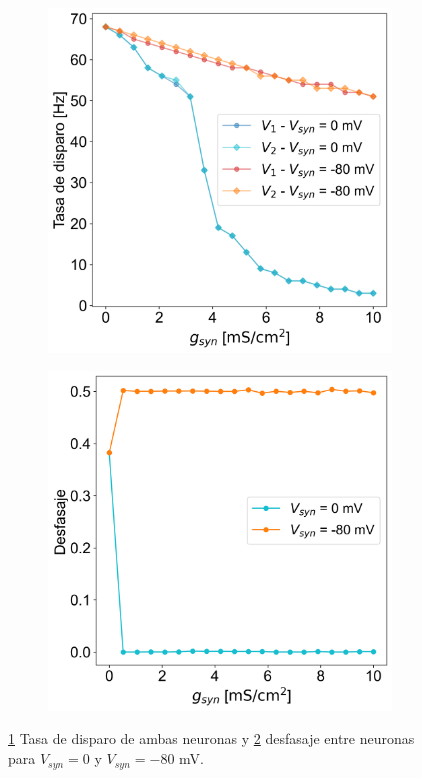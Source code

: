 \documentclass[aps,prb,twocolumn,superscriptaddress,floatfix,longbibliography]{revtex4-2}
\newcounter{para}
\begin{document}
\begin{figure}[h]
   \centering
   \begin{subfigure}[b]{0.45\textwidth}
        \includegraphics[clip=true,width=\columnwidth]{ej1_tasa.png}
        \caption{\label{fig:ej1_tasa}}
   \end{subfigure}
    \begin{subfigure}[b]{0.45\textwidth}
          \includegraphics[clip=true,width=\columnwidth]{ej1_desfasaje.png}
          \caption{\label{fig:ej1_desfasaje}}
    \end{subfigure}
    \caption{\ref{fig:ej1_tasa} Tasa de disparo de ambas neuronas y \ref{fig:ej1_desfasaje} desfasaje entre neuronas para $V_{syn} = 0$ y $V_{syn} = -80$ mV.}
    \label{fig:ej1_tasa_desfasaje}
\end{figure}
\end{document}
